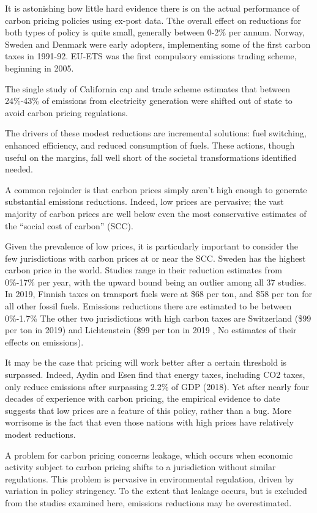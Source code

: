 \documentclass[
]{book}
\begin{document}
It is astonishing how little hard evidence there is on the actual performance of
carbon pricing policies using ex-post data.
Tthe overall effect on reductions for both types of policy is
quite small, generally between 0-2\% per annum.
Norway, Sweden and Denmark were early
adopters, implementing some of the first carbon taxes in 1991-92.
EU-ETS was the first compulsory emissions trading scheme, beginning in 2005.

The single study of California cap and trade scheme
estimates that between 24\%-43\% of emissions from electricity generation were shifted out of
state to avoid carbon pricing regulations.

The drivers of these modest reductions are incremental solutions: fuel switching,
enhanced efficiency, and reduced consumption of fuels.
These actions, though useful on the margins, fall well short of
the societal transformations identified needed.

A common rejoinder is that carbon prices simply aren't high enough to generate substantial
emissions reductions.
Indeed, low prices are pervasive; the vast majority of carbon prices are
well below even the most conservative estimates of the ``social cost of carbon'' (SCC).

Given the prevalence of low prices, it is particularly important to consider the few jurisdictions
with carbon prices at or near the SCC.
Sweden has the highest carbon price in the world.
Studies range in their reduction estimates from 0\%-17\% per year, with the upward
bound being an outlier among all 37 studies.
In 2019, Finnish taxes on transport fuels were at \$68 per ton, and \$58 per ton for
all other fossil fuels.
Emissions reductions there are estimated to be between 0\%-1.7\%
The other two jurisdictions with high carbon taxes are
Switzerland (\$99 per ton in 2019) and Lichtenstein (\$99 per ton in 2019
, No estimates of their effects on emissions).

It may be the case that pricing will work better after a certain threshold is surpassed. Indeed,
Aydin and Esen find that energy taxes, including CO2 taxes, only reduce emissions after
surpassing 2.2\% of GDP (2018). Yet after nearly four decades of experience with carbon pricing,
the empirical evidence to date suggests that low prices are a feature of this policy, rather than a
bug. More worrisome is the fact that even those nations with high prices have relatively
modest reductions.

A problem for carbon pricing concerns leakage, which occurs when economic
activity subject to carbon pricing shifts to a jurisdiction without similar regulations. This
problem is pervasive in environmental regulation, driven by variation in policy stringency.
To the extent that leakage occurs, but is excluded from the studies examined here, emissions
reductions may be overestimated.
\end{document}
